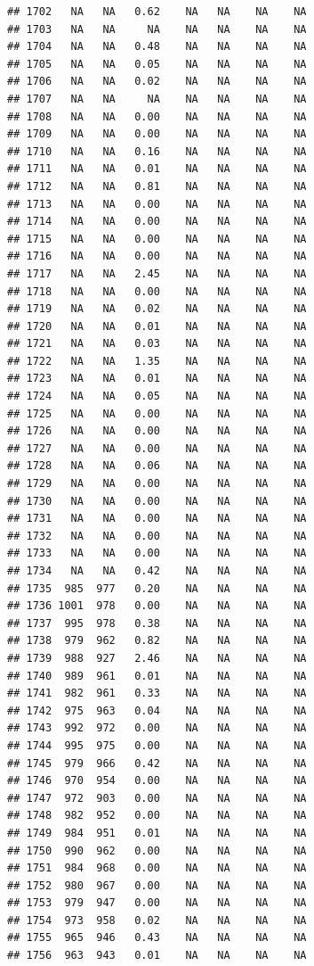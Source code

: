\documentclass{article}\usepackage{graphicx, color}
\makeatletter
\newenvironment{kframe}{%
 \def\at@end@of@kframe{}%
 \ifinner\ifhmode%
  \def\at@end@of@kframe{\end{minipage}}%
  \begin{minipage}{\columnwidth}%
 \fi\fi%
 \def\FrameCommand##1{\hskip\@totalleftmargin \hskip-\fboxsep
 \colorbox{shadecolor}{##1}\hskip-\fboxsep
     \hskip-\linewidth \hskip-\@totalleftmargin \hskip\columnwidth}%
 \MakeFramed {\advance\hsize-\width
   \@totalleftmargin\z@ \linewidth\hsize
   \@setminipage}}%
 {\par\unskip\endMakeFramed%
 \at@end@of@kframe}
\newenvironment{knitrout}{}{} %
\makeatother
\begin{document}
\begin{knitrout}
\begin{kframe}
\begin{verbatim}
## 1702   NA   NA   0.62    NA   NA    NA    NA
## 1703   NA   NA     NA    NA   NA    NA    NA
## 1704   NA   NA   0.48    NA   NA    NA    NA
## 1705   NA   NA   0.05    NA   NA    NA    NA
## 1706   NA   NA   0.02    NA   NA    NA    NA
## 1707   NA   NA     NA    NA   NA    NA    NA
## 1708   NA   NA   0.00    NA   NA    NA    NA
## 1709   NA   NA   0.00    NA   NA    NA    NA
## 1710   NA   NA   0.16    NA   NA    NA    NA
## 1711   NA   NA   0.01    NA   NA    NA    NA
## 1712   NA   NA   0.81    NA   NA    NA    NA
## 1713   NA   NA   0.00    NA   NA    NA    NA
## 1714   NA   NA   0.00    NA   NA    NA    NA
## 1715   NA   NA   0.00    NA   NA    NA    NA
## 1716   NA   NA   0.00    NA   NA    NA    NA
## 1717   NA   NA   2.45    NA   NA    NA    NA
## 1718   NA   NA   0.00    NA   NA    NA    NA
## 1719   NA   NA   0.02    NA   NA    NA    NA
## 1720   NA   NA   0.01    NA   NA    NA    NA
## 1721   NA   NA   0.03    NA   NA    NA    NA
## 1722   NA   NA   1.35    NA   NA    NA    NA
## 1723   NA   NA   0.01    NA   NA    NA    NA
## 1724   NA   NA   0.05    NA   NA    NA    NA
## 1725   NA   NA   0.00    NA   NA    NA    NA
## 1726   NA   NA   0.00    NA   NA    NA    NA
## 1727   NA   NA   0.00    NA   NA    NA    NA
## 1728   NA   NA   0.06    NA   NA    NA    NA
## 1729   NA   NA   0.00    NA   NA    NA    NA
## 1730   NA   NA   0.00    NA   NA    NA    NA
## 1731   NA   NA   0.00    NA   NA    NA    NA
## 1732   NA   NA   0.00    NA   NA    NA    NA
## 1733   NA   NA   0.00    NA   NA    NA    NA
## 1734   NA   NA   0.42    NA   NA    NA    NA
## 1735  985  977   0.20    NA   NA    NA    NA
## 1736 1001  978   0.00    NA   NA    NA    NA
## 1737  995  978   0.38    NA   NA    NA    NA
## 1738  979  962   0.82    NA   NA    NA    NA
## 1739  988  927   2.46    NA   NA    NA    NA
## 1740  989  961   0.01    NA   NA    NA    NA
## 1741  982  961   0.33    NA   NA    NA    NA
## 1742  975  963   0.04    NA   NA    NA    NA
## 1743  992  972   0.00    NA   NA    NA    NA
## 1744  995  975   0.00    NA   NA    NA    NA
## 1745  979  966   0.42    NA   NA    NA    NA
## 1746  970  954   0.00    NA   NA    NA    NA
## 1747  972  903   0.00    NA   NA    NA    NA
## 1748  982  952   0.00    NA   NA    NA    NA
## 1749  984  951   0.01    NA   NA    NA    NA
## 1750  990  962   0.00    NA   NA    NA    NA
## 1751  984  968   0.00    NA   NA    NA    NA
## 1752  980  967   0.00    NA   NA    NA    NA
## 1753  979  947   0.00    NA   NA    NA    NA
## 1754  973  958   0.02    NA   NA    NA    NA
## 1755  965  946   0.43    NA   NA    NA    NA
## 1756  963  943   0.01    NA   NA    NA    NA

\end{verbatim}
\end{kframe}
\end{knitrout}
\end{document}

